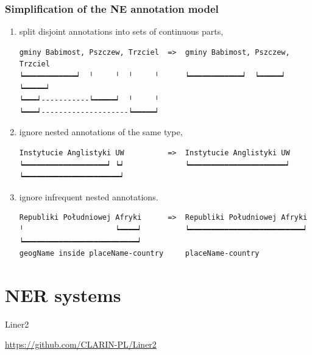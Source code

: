 \documentclass[Warsaw]{beamer}
\begin{document}
\begin{frame}[fragile]
    \frametitle{Simplification of the NE annotation model}
    
    \begin{enumerate}
        \item split disjoint annotations into sets of continuous parts,
        {\scriptsize
        \begin{verbatim}
gminy Babimost, Pszczew, Trzciel  =>  gminy Babimost, Pszczew, Trzciel
┕━━━━━━━━━━━━┙  ╵     ╵  ╵     ╵      ┕━━━━━━━━━━━━┙  ┕━━━━━┙  ┕━━━━━┙
┕━━━┙-----------┕━━━━━┙  ╵     ╵    
┕━━━┙--------------------┕━━━━━┙      
        \end{verbatim}
        }

        \item ignore nested annotations of the same type,
        {\scriptsize
        \begin{verbatim}
Instytucie Anglistyki UW          =>  Instytucie Anglistyki UW
┕━━━━━━━━━━━━━━━━━━━┙ ┕┙              ┕━━━━━━━━━━━━━━━━━━━━━━┙
┕━━━━━━━━━━━━━━━━━━━━━━┙
        \end{verbatim}
        }
        
        \item ignore infrequent nested annotations.
        {\scriptsize
        \begin{verbatim}
Republiki Południowej Afryki      =>  Republiki Południowej Afryki
╵                     ┕━━━━┙          ┕━━━━━━━━━━━━━━━━━━━━━━━━━━┙
┕━━━━━━━━━━━━━━━━━━━━━━━━━━┙
geogName inside placeName-country     placeName-country
        \end{verbatim}
        }
    \end{enumerate}
    
\end{frame}

\section{NER systems}

\begin{frame}
    \begin{center}
        \Huge
        Liner2
        
        \normalsize
        \url{https://github.com/CLARIN-PL/Liner2}
    \end{center}
\end{frame}
\end{document}
